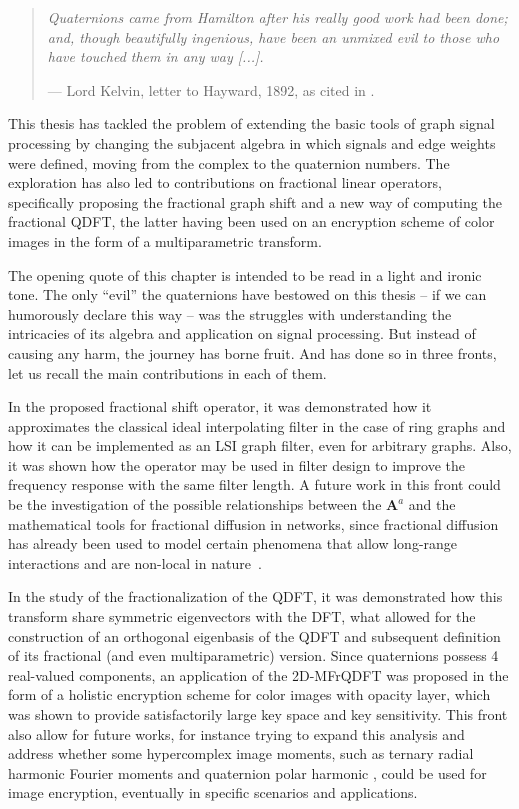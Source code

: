 \begin{quotation}
\itshape
Quaternions came from Hamilton after his really good work had been done; and, though beautifully ingenious, have been an unmixed evil to those who have touched them in any way [...].

\noindent --- Lord Kelvin, letter to Hayward, 1892, as cited in \cite{altmann1989hamilton}.
\end{quotation}

This thesis has tackled the problem of extending the basic tools of graph signal processing by changing the subjacent algebra in which signals and edge weights were defined, moving from the complex to the quaternion numbers. The exploration has also led to contributions on fractional linear operators, specifically proposing the fractional graph shift and a new way of computing the fractional QDFT, the latter having been used on an encryption scheme of color images in the form of a multiparametric transform.

The opening quote of this chapter is intended to be read in a light and ironic tone. The only ``evil'' the quaternions have bestowed on this thesis -- if we can humorously declare this way --  was the struggles with understanding the intricacies of its algebra and application on signal processing. But instead of causing any harm, the journey has borne fruit. And has done so in three fronts, let us recall the main contributions in each of them.

In the proposed fractional shift operator, it was demonstrated how it approximates  the classical ideal interpolating filter in the case of ring graphs and how it can be implemented as an LSI graph filter, even for arbitrary graphs. Also, it was shown how the operator may be used in filter design to improve the frequency response with the same filter length. A future work in this front could be the investigation of the possible relationships between the $\mathbf{A}^a$ and the mathematical tools for fractional diffusion in networks, since fractional diffusion has already been used to model certain phenomena that allow long-range interactions and are non-local in nature~\cite{ilic2005,riascos2014,estrada2021,antil2021}.

In the study of the fractionalization of the QDFT, it was demonstrated how this transform share symmetric eigenvectors with the DFT, what allowed for the construction of an orthogonal eigenbasis of the QDFT and subsequent definition of its fractional (and even multiparametric) version. Since quaternions possess 4 real-valued components, an application of the 2D-MFrQDFT was proposed in the form of a holistic encryption scheme for color images with opacity layer, which was shown to provide satisfactorily large key space and key sensitivity. This front also allow for future works, for instance trying to expand this analysis and address whether some hypercomplex image moments, such as ternary radial harmonic Fourier moments and quaternion polar harmonic \cite{wang2019ternary,wang2018quaternion}, could be used for image encryption, eventually in specific scenarios and applications.

